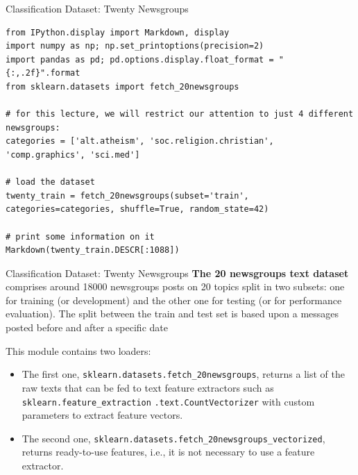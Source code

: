 \documentclass[../../main.tex]{subfiles}
\begin{document}
\begin{frame}[fragile]{Classification Dataset: Twenty Newsgroups}


\begin{lstlisting}
from IPython.display import Markdown, display
import numpy as np; np.set_printoptions(precision=2)
import pandas as pd; pd.options.display.float_format = "{:,.2f}".format
from sklearn.datasets import fetch_20newsgroups

# for this lecture, we will restrict our attention to just 4 different newsgroups:
categories = ['alt.atheism', 'soc.religion.christian', 'comp.graphics', 'sci.med']

# load the dataset
twenty_train = fetch_20newsgroups(subset='train', categories=categories, shuffle=True, random_state=42)

# print some information on it
Markdown(twenty_train.DESCR[:1088])
\end{lstlisting}
\end{frame}

\begin{frame}[fragile]{Classification Dataset: Twenty Newsgroups}
\textbf{The 20 newsgroups text dataset} comprises around 18000 newsgroups posts on 20 topics split in two subsets: one for training (or development) and the other one for testing (or for performance evaluation). The split between the train and test set is based upon a messages posted before and after a specific date

\vspace{0.2cm}
This module contains two loaders:
\begin{itemize}
    \item The first one, \texttt{sklearn.datasets.fetch\_20newsgroups}, returns a list of the raw texts that can be fed to text feature extractors such as \texttt{sklearn.feature\_extraction} \texttt{.text.CountVectorizer} with custom parameters to extract feature vectors.
    \item The second one, \texttt{sklearn.datasets.fetch\_20newsgroups\_vectorized}, returns ready-to-use features, i.e., it is not necessary to use a feature extractor.
\end{itemize}
\end{frame}
\end{document}
